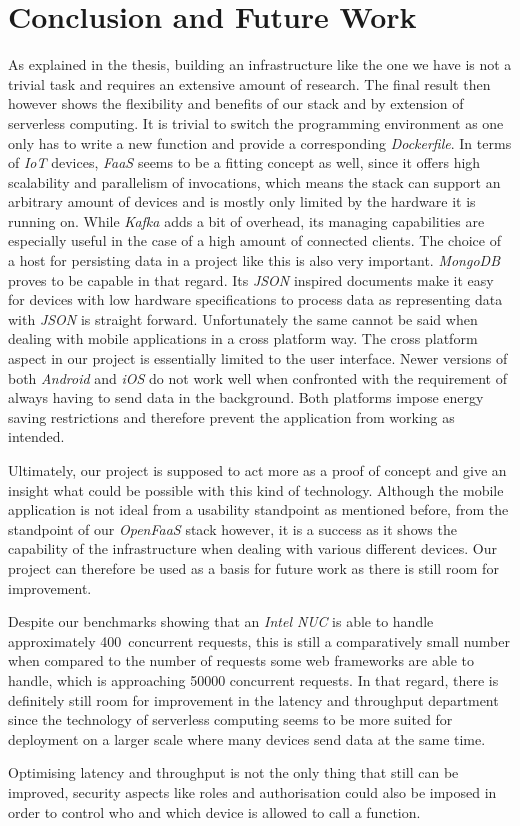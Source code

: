 \chapter{Conclusion and Future Work}
\label{sec:conclusion}

As explained in the thesis, building an infrastructure like the one we have is not a trivial task
and requires an extensive amount of research. The final result then however shows the flexibility
and benefits of our stack and by extension of serverless computing. It is trivial to switch
the programming environment as one only has to write a new function and provide a corresponding
\textit{Dockerfile}. In terms of \textit{IoT} devices, \textit{FaaS} seems to be a fitting concept
as well, since it offers high scalability and parallelism of invocations, which means the stack can
support an arbitrary amount of devices and is mostly only limited by the hardware it is running on.
While \textit{Kafka} adds a bit of overhead, its managing capabilities are especially useful in the
case of a high amount of connected clients. The choice of a host for persisting data in a project
like this is also very important. \textit{MongoDB} proves to be capable in that regard. Its
\textit{JSON} inspired documents make it easy for devices with low hardware specifications to
process data as representing data with \textit{JSON} is straight forward. Unfortunately the same
cannot be said when dealing with mobile applications in a cross platform way. The
cross platform aspect in our project is essentially limited to the user interface. Newer
versions of both \textit{Android} and \textit{iOS} do not work well when confronted with the
requirement of always having to send data in the background. Both platforms impose energy saving
restrictions and therefore prevent the application from working as intended.

Ultimately, our project is supposed to act more as a proof of concept and give an insight what could
be possible with this kind of technology. Although the mobile application is not ideal from a
usability standpoint as mentioned before, from the standpoint of our \textit{OpenFaaS} stack
however, it is a success as it shows the capability of the infrastructure when dealing with
various different devices. Our project can therefore be used as a basis for future work as there is
still room for improvement.

Despite our benchmarks showing that an \textit{Intel NUC} is able to handle approximately
400~concurrent requests, this is still a comparatively small number when compared to the number
of requests some web frameworks are able to handle, which is approaching 50000 concurrent requests.
\cite{webframework-benchmarks} In that regard, there is definitely still room for improvement in
the latency and throughput department since the technology of serverless computing seems to be more
suited for deployment on a larger scale where many devices send data at the same time.

Optimising latency and throughput is not the only thing that still can be improved, security
aspects like roles and authorisation could also be imposed in order to control who and which
device is allowed to call a function.
